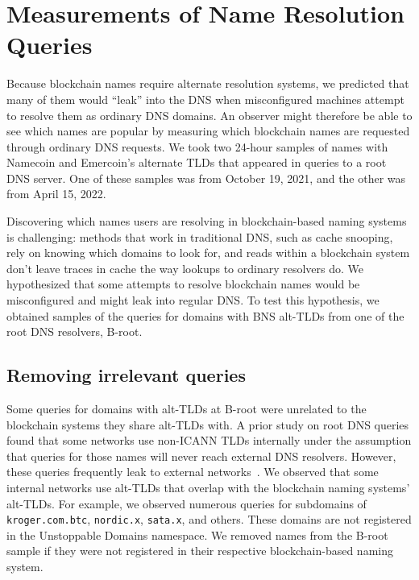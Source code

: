 \section{Measurements of Name Resolution Queries}

Because blockchain names require alternate resolution systems, we predicted 
that many of them would ``leak'' into the DNS when misconfigured machines 
attempt to resolve them as ordinary DNS domains. An observer might therefore be 
able to see which names are popular by measuring which blockchain names are 
requested through ordinary DNS requests. We took two 24-hour samples of names 
with Namecoin and Emercoin's alternate TLDs that appeared in 
queries to a root DNS server. One of these samples was from October 19, 2021, 
and the other was from April 15, 2022.

Discovering which names users are resolving in blockchain-based 
naming systems is challenging: methods that work in traditional DNS, such as 
cache snooping, rely on knowing which domains to look for, and reads within a 
blockchain system don't leave traces in cache the way lookups to ordinary 
resolvers do. We hypothesized that some attempts to resolve blockchain names 
would be misconfigured and might leak into regular DNS. To test this 
hypothesis, we obtained samples of the queries for domains with BNS alt-TLDs 
from one of the root DNS resolvers, B-root.

\subsection{Removing irrelevant queries}

Some queries for domains with alt-TLDs at B-root were unrelated to the 
blockchain systems they share alt-TLDs with. A prior study on root DNS queries 
found that some networks use non-ICANN TLDs internally under the assumption 
that queries for those names will never reach external DNS resolvers. However, 
these queries frequently leak to external networks~\cite{chen_wpad_2016}. We 
observed that some 
internal networks use alt-TLDs that overlap with the blockchain naming systems' 
alt-TLDs. For example, we observed numerous queries for subdomains of 
\texttt{kroger.com.btc}, \texttt{nordic.x}, \texttt{sata.x}, and others. These 
domains are not registered in the Unstoppable Domains namespace. We removed 
names from the B-root sample if they were not registered in their respective 
blockchain-based naming system.

